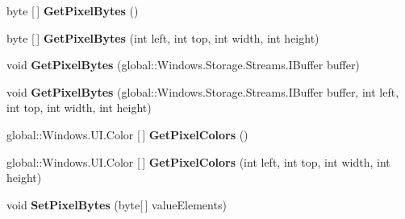 \begin{DoxyCompactItemize}
\item 
\mbox{\label{interface_microsoft_1_1_graphics_1_1_canvas_1_1_i_canvas_bitmap_ab71519e7f2009a2ac025f505eab45531}} 
byte \mbox{[}$\,$\mbox{]} {\bfseries Get\+Pixel\+Bytes} ()
\item 
\mbox{\label{interface_microsoft_1_1_graphics_1_1_canvas_1_1_i_canvas_bitmap_a41fdae7de41d057403b9f1a16ecff1d2}} 
byte \mbox{[}$\,$\mbox{]} {\bfseries Get\+Pixel\+Bytes} (int left, int top, int width, int height)
\item 
\mbox{\label{interface_microsoft_1_1_graphics_1_1_canvas_1_1_i_canvas_bitmap_a36158bf3dac9d5cdb9a1a41a7fc3708d}} 
void {\bfseries Get\+Pixel\+Bytes} (global\+::\+Windows.\+Storage.\+Streams.\+I\+Buffer buffer)
\item 
\mbox{\label{interface_microsoft_1_1_graphics_1_1_canvas_1_1_i_canvas_bitmap_a6854e3ad20296f41992100acc94e6bdb}} 
void {\bfseries Get\+Pixel\+Bytes} (global\+::\+Windows.\+Storage.\+Streams.\+I\+Buffer buffer, int left, int top, int width, int height)
\item 
\mbox{\label{interface_microsoft_1_1_graphics_1_1_canvas_1_1_i_canvas_bitmap_ad6aeb3bf7ad3092e46d6a3133472b1d1}} 
global\+::\+Windows.\+U\+I.\+Color \mbox{[}$\,$\mbox{]} {\bfseries Get\+Pixel\+Colors} ()
\item 
\mbox{\label{interface_microsoft_1_1_graphics_1_1_canvas_1_1_i_canvas_bitmap_ac162dc28f7d3a5de4034936d417c24e5}} 
global\+::\+Windows.\+U\+I.\+Color \mbox{[}$\,$\mbox{]} {\bfseries Get\+Pixel\+Colors} (int left, int top, int width, int height)
\item 
\mbox{\label{interface_microsoft_1_1_graphics_1_1_canvas_1_1_i_canvas_bitmap_a811bec820a040dca5292270d03b6431f}} 
void {\bfseries Set\+Pixel\+Bytes} (byte\mbox{[}$\,$\mbox{]} value\+Elements)
\item 

\end{DoxyCompactItemize}
